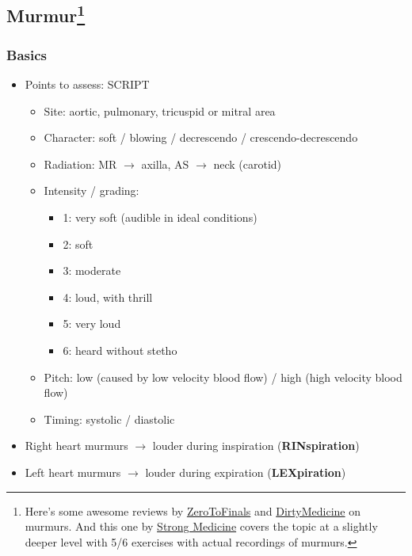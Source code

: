 \documentclass[
  12pt,
]{memoir}
\providecommand{\tightlist}{%
  \setlength{\itemsep}{0pt}\setlength{\parskip}{0pt}}
\begin{document}
\subsection[Murmur]{Murmur\footnote{Here's some awesome reviews by
 \href{https://zerotofinals.com/medicine/cardiology/murmurs/}{ZeroToFinals}
 and
 \href{https://youtu.be/teJcTTVZnzs}{DirtyMedicine} on murmurs.
 And this one by \href{https://youtu.be/lFcf5a6BZGw}{Strong Medicine}
 covers the topic at a slightly deeper level with 5/6 exercises
 with actual recordings of murmurs.}}

\hypertarget{basics}{%
\subsubsection{Basics}\label{basics}}

\begin{itemize}
\tightlist
\item
  Points to assess: SCRIPT

  \begin{itemize}
  \tightlist
  \item
    Site: aortic, pulmonary, tricuspid or mitral area
  \item
    Character: soft / blowing / decrescendo / crescendo-decrescendo
  \item
    Radiation: MR \(\rightarrow\) axilla, AS \(\rightarrow\) neck
    (carotid)
  \item
    Intensity / grading:

    \begin{itemize}
    \tightlist
    \item
      1: very soft (audible in ideal conditions)
    \item
      2: soft
    \item
      3: moderate
    \item
      4: loud, with thrill
    \item
      5: very loud
    \item
      6: heard without stetho
    \end{itemize}
  \item
    Pitch: low (caused by low velocity blood flow) / high (high velocity
    blood flow)
  \item
    Timing: systolic / diastolic
  \end{itemize}
\item
  Right heart murmurs \(\rightarrow\) louder during inspiration
  (\textbf{RINspiration})
\item
  Left heart murmurs \(\rightarrow\) louder during expiration
  (\textbf{LEXpiration})
\end{itemize}
\end{document}
